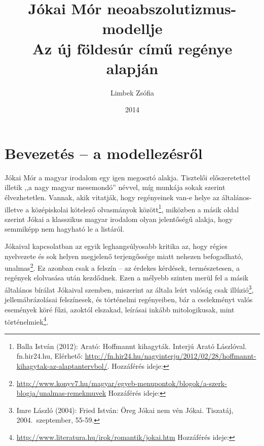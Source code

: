 \documentclass{thesis-ekf}
\begin{document}
    \title{Jókai Mór neoabszolutizmus-modellje\\Az új földesúr című regénye alapján}
    \author{Limbek Zsófia}
    \date{2014}

    \maketitle

    \setcounter{tocdepth}{1}
    \tableofcontents

    \chapter{Bevezetés – a modellezésről}

    Jókai Mór a magyar irodalom egy igen megosztó alakja.
    Tisztelői előszeretettel illetik ,,a nagy magyar mesemondó'' névvel, míg munkája sokak szerint élvezhetetlen.
    Vannak, akik vitatják, hogy regényeinek van-e helye az általános- illetve a középiskolai kötelező olvasmányok
        között\footnote{Balla István (2012): Arató: Hoffmannt kihagyták. Interjú Arató Lászlóval.
            fn.hir24.hu, 
            Elérhető: \url{http://fn.hir24.hu/nagyinterju/2012/02/28/hoffmannt-kihagytak-az-alaptantervbol/}.
            Hozzáférés ideje: },
        miközben a másik oldal szerint Jókai a klasszikus magyar irodalom olyan jelentőségű alakja, hogy semmiképp
        nem hagyható le a listáról.

    Jókaival kapcsolatban az egyik leghangsúlyosabb kritika az, hogy régies nyelvezete és sok helyen megjelenő
        terjengőssége miatt nehezen befogadható, unalmas\footnote{
            \url{http://www.konyv7.hu/magyar/egyeb-menupontok/blogok/a-szerk-blogja/unalmas-remekmuvek}
            Hozzáférés ideje: }.
    Ez azonban csak a felszín – az érdekes kérdések, természetesen, a regények elolvasása után kezdődnek.
    Ezen a mélyebb szinten merül fel a másik általános bírálat Jókaival szemben, miszerint az általa leírt valóság csak
        illúzió\footnote{Imre László (2004): Fried István: Öreg Jókai nem vén Jókai. Tiszatáj, 2004.~szeptember, 55-59.},
        jellemábrázolásai felszínesek, és történelmi regényeiben, bár a cselekményt valós események köré fűzi,
        azoktól elszakad, leírásai inkább mitologikusak, mint történelmiek\footnote{
            \url{http://www.literatura.hu/irok/romantik/jokai.htm}
            Hozzáférés ideje: }.
\end{document}
